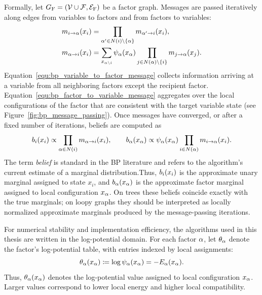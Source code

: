 Formally, let $G_{\mathrm{F}}=(\mathcal{V}\cup\mathcal{F},\mathcal{E}_{\mathrm{F}})$ be a factor graph. Messages are passed iteratively along edges from variables to factors and from factors to variables:
\begin{align}
    \label{equ:bp_variable_to_factor_message}
    m_{i\rightarrow \alpha}(x_i) &= \prod_{\alpha'\in N(i)\setminus\{\alpha\}} m_{\alpha'\rightarrow i}(x_i),\\
    \label{equ:bp_factor_to_variable_message}
    m_{\alpha\rightarrow i}(x_i) &= \sum_{x_{\alpha\setminus i}} \psi_{\alpha}(x_{\alpha})\prod_{j\in N(\alpha)\setminus\{i\}} m_{j\rightarrow \alpha}(x_j).
\end{align}
Equation~\eqref{equ:bp_variable_to_factor_message} collects information arriving at a variable from all neighboring factors except the recipient factor. Equation~\eqref{equ:bp_factor_to_variable_message} aggregates over the local configurations of the factor that are consistent with the target variable state (see Figure~\ref{fig:bp_message_passing}). Once messages have converged, or after a fixed number of iterations, beliefs are computed as
\begin{equation}
    \label{equ:bp_beliefs}
    b_i(x_i)\propto \prod_{\alpha\in N(i)} m_{\alpha\rightarrow i}(x_i), \qquad b_{\alpha}(x_{\alpha})\propto \psi_{\alpha}(x_{\alpha}) \prod_{i\in N(\alpha)} m_{i\rightarrow \alpha}(x_i).
\end{equation}
The term \emph{belief} is standard in the BP literature and refers to the algorithm's current estimate of a marginal distribution.Thus, $b_i(x_i)$ is the approximate unary marginal assigned to state $x_i$, and $b_{\alpha}(x_{\alpha})$ is the approximate factor marginal assigned to local configuration $x_{\alpha}$. On trees these beliefs coincide exactly with the true marginals; on loopy graphs they should be interpreted as locally normalized approximate marginals produced by the message-passing iterations.



For numerical stability and implementation efficiency, the algorithms used in this thesis are written in the log-potential domain. For each factor $\alpha$, let $\theta_{\alpha}$ denote the factor's log-potential table, with entries indexed by local assignments:
\begin{equation}
\label{equ:log_potential_definition}
    \theta_{\alpha}(x_{\alpha}) \coloneq \log \psi_{\alpha}(x_{\alpha}) = -E_{\alpha}(x_{\alpha}).
\end{equation}
Thus, $\theta_{\alpha}(x_{\alpha})$ denotes the log-potential value assigned to local configuration $x_{\alpha}$. Larger values correspond to lower local energy and higher local compatibility.

